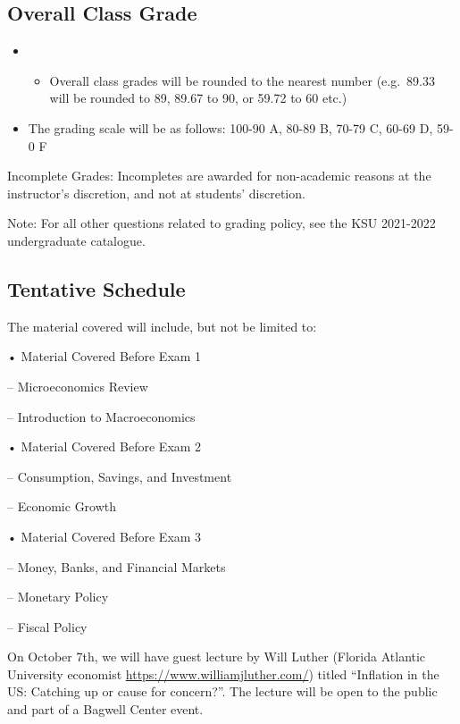 \documentclass[11pt,]{article}
\providecommand{\tightlist}{%
  \setlength{\itemsep}{0pt}\setlength{\parskip}{0pt}}
\begin{document}
\hypertarget{overall-class-grade}{%
\subsection{Overall Class Grade}\label{overall-class-grade}}

\begin{itemize}
\item
  \begin{itemize}
  \tightlist
  \item
    Overall class grades will be rounded to the nearest number (e.g.~89.33 will be rounded to 89, 89.67 to
    90, or 59.72 to 60 etc.)
  \end{itemize}
\item
  The grading scale will be as follows: 100-90 A, 80-89 B, 70-79 C, 60-69 D, 59-0 F
\end{itemize}

Incomplete Grades: Incompletes are awarded for non-academic reasons at the instructor's discretion, and
not at students' discretion.

Note: For all other questions related to grading policy, see the KSU 2021-2022 undergraduate catalogue.
\newpage

\hypertarget{tentative-schedule}{%
\subsection*{Tentative Schedule}\label{tentative-schedule}}

The material covered will include, but not be limited to:

• Material Covered Before Exam 1

-- Microeconomics Review

-- Introduction to Macroeconomics

• Material Covered Before Exam 2

-- Consumption, Savings, and Investment

-- Economic Growth

• Material Covered Before Exam 3

-- Money, Banks, and Financial Markets

-- Monetary Policy

-- Fiscal Policy

On October 7th, we will have guest lecture by Will Luther (Florida Atlantic University economist \url{https://www.williamjluther.com/}) titled ``Inflation in the US: Catching up or cause for concern?''. The lecture will be open to the public and part of a Bagwell Center event.
\end{document}
